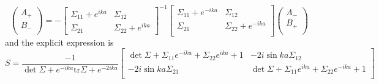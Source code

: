 \begin{widetext}
\begin{equation}
\label{eq:discrete_S}
\begin{pmatrix}
A_{+} \\
B_{-}\\
\end{pmatrix}
=-
\begin{bmatrix}
\Sigma_{11} +e^{ika} & \Sigma_{12}\\
\Sigma_{21} & \Sigma_{22} + e^{ika}
\end{bmatrix}^{-1}
\begin{bmatrix}
\Sigma_{11} + e^{-ika} & \Sigma_{12} \\
\Sigma_{21} & \Sigma_{22}  + e^{-ika}  \\
\end{bmatrix}
\begin{pmatrix}
A_{-}\\
B_{+}\\
\end{pmatrix}
\end{equation}
and the explicit expression is
\begin{equation}
  S = \frac{-1}{ \det \Sigma  + e^{-ika} \text{tr} \Sigma   + e^{-2ika}}
\begin{bmatrix}
\det \Sigma+ \Sigma_{11} e^{-ika} + \Sigma_{22} e^{ika}+1  & -2i \sin ka \Sigma_{12}  \\
-2i \sin ka \Sigma_{21} &  \det \Sigma+ \Sigma_{11} e^{ika} + \Sigma_{22} e^{-ika}+1\\
\end{bmatrix}
\end{equation}
\end{widetext}

